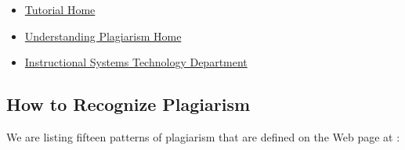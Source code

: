 \begin{itemize}
\item
  \href{https://www.indiana.edu/~academy/firstPrinciples/choice.html}{Tutorial
  Home}
\item
  \href{https://www.indiana.edu/~tedfrick/plagiarism/}{Understanding
  Plagiarism Home}
\item
  \href{http://education.indiana.edu/graduate/programs/instructional-systems/index.html}{Instructional
  Systems Technology Department}
\end{itemize}

\subsection{How to Recognize Plagiarism}

We are listing fifteen patterns of plagiarism that are defined on the Web
page at \cite{}:

